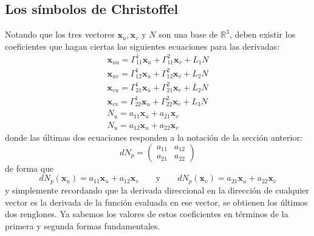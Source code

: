 \documentclass[spanish]{book}
\theoremstyle{definition}
\begin{document}
\subsection{Los símbolos de Christoffel}
Notando que los tres vectores $\mathbf x_u,\mathbf x_v$ y $N$ son una base de $\mathbb R^3$, deben existir los coeficientes que hagan ciertas las siguientes ecuaciones para las derivadas:
\begin{align*}
	\mathbf x_{uu}=\Gamma^1_{11}\mathbf x_u+\Gamma^2_{11}\mathbf x_v+L_1N\\
	\mathbf x_{uv}=\Gamma^1_{12}\mathbf x_u+\Gamma^2_{12}\mathbf x_v+L_2N\\
	\mathbf x_{vu}=\Gamma^1_{21}\mathbf x_u+\Gamma^2_{21}\mathbf x_v+\bar L_2N\\
	\mathbf x_{vv}=\Gamma^1_{22}\mathbf x_u+\Gamma^2_{22}\mathbf x_v+L_3N\\
	N_u=a_{11}\mathbf x_u+a_{21}\mathbf x_v\\
	N_u=a_{12}\mathbf x_u+a_{22}\mathbf x_v
\end{align*}
donde las últimas dos ecuaciones responden a la notación de la sección anterior:
\[dN_p=\begin{pmatrix}a_{11}&a_{12}\\a_{21}&a_{22}\end{pmatrix}\]
de forma que
\[dN_p(\mathbf{x}_u)=a_{11}\mathbf{x}_u+a_{12}\mathbf{x}_v\qquad\text{y}\qquad dN_p(\mathbf{x}_v)=a_{21}\mathbf{x}_u+a_{22}\mathbf{x}_v\]
y simplemente recordando que la derivada direccional en la dirección de cualquier vector es la derivada de la función evaluada en ese vector, se obtienen los últimos dos renglones. Ya sabemos los valores de estos coeficientes en términos de la primera y segunda formas fundamentales.
\end{document}
